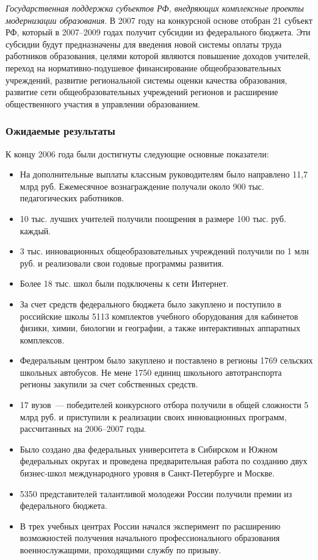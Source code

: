 \documentclass[article, 12pt, russian, oneside]{ncc}
\begin{document}
\emph{Государственная поддержка субъектов РФ, внедряющих комплексные проекты модернизации образования}. В 2007 году на конкурсной основе отобран 21 субъект РФ, который в 2007--2009 годах получит субсидии из федерального бюджета. Эти субсидии будут предназначены для введения новой системы оплаты труда работников образования, целями которой являются повышение доходов учителей, переход на нормативно-подушевое финансирование общеобразовательных учреждений, развитие региональной системы оценки качества образования, развитие сети общеобразовательных учреждений регионов и расширение общественного участия в управлении образованием.

\subsubsection{Ожидаемые результаты}

К концу 2006 года были достигнуты следующие основные показатели:

\begin{itemize}
\item На дополнительные выплаты классным руководителям было направлено 11,7 млрд руб. Ежемесячное вознаграждение получали около 900 тыс. педагогических работников.
\item 10 тыс. лучших учителей получили поощрения в размере 100 тыс. руб. каждый.
\item 3 тыс. инновационных общеобразовательных учреждений получили по 1 млн руб. и реализовали свои годовые программы развития.
\item Более 18 тыс. школ были подключены к сети Интернет.
\item За счет средств федерального бюджета было закуплено и поступило в российские школы 5113 комплектов учебного оборудования для кабинетов физики, химии, биологии и географии, а также интерактивных аппаратных комплексов.
\item Федеральным центром было закуплено и поставлено в регионы 1769 сельских школьных автобусов. Не мене 1750 единиц школьного автотранспорта регионы закупили за счет собственных средств.
\item 17 вузов~--- победителей конкурсного отбора получили в общей сложности 5 млрд руб. и приступили к реализации своих инновационных программ, рассчитанных на 2006--2007 годы.
\item Было создано два федеральных университета в Сибирском и Южном федеральных округах и проведена предварительная работа по созданию двух бизнес-школ международного уровня в Санкт-Петербурге и Москве.
\item 5350 представителей талантливой молодежи России получили премии из федерального бюджета.
\item В трех учебных центрах России начался эксперимент по расширению возможностей получения начального профессионального образования военнослужащими, проходящими службу по призыву.
\end{itemize}
\end{document}
